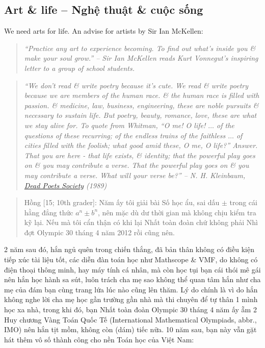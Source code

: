 \documentclass[12pt]{article}
\begin{document}
\subsection{Art \& life -- Nghệ thuật \& cuộc sống}
We need arts for life. An advise for artists by Sir {\sc Ian McKellen}:
\begin{quotation}\it
	``Practice any art to experience becoming. To find out what's inside you \& make your soul grow.'' -- Sir {\sc Ian McKellen} reads Kurt Vonnegut's inspiring letter to a group of school students.
\end{quotation}

\begin{quotation}\it
	``We don't read \& write poetry because it's cute. We read \& write poetry because we are members of the human race. \& the human race is filled with passion. \& medicine, law, business, engineering, these are noble pursuits \& necessary to sustain life. But poetry, beauty, romance, love, these are what we stay alive for. To quote from Whitman, ``O me! O life! $\ldots$ of the questions of these recurring; of the endless trains of the faithless $\ldots$ of cities filled with the foolish; what good amid these, O me, O life?'' Answer. That you are here - that life exists, \& identity; that the powerful play goes on \& you may contribute a verse. That the powerful play \emph{goes on} \& you may contribute a verse. What will your verse be?'' --  {\sc N. H. Kleinbaum}, \href{https://www.imdb.com/title/tt0097165}{\it Dead Poets Society} (1989)
\end{quotation}

\begin{quote}
	{\sf Hồng [15; 10th grader]}: Năm ấy tôi giải bài Số học ẩu, sai dấu $\pm$ trong cái hằng đẳng thức $a^n\pm b^n$, nên mặc dù dư thời gian mà không chịu kiểm tra kỹ lại. Nếu mà tôi cẩn thận có khi lại Nhất toàn đoàn chứ không phải Nhì đợt Olympic 30 tháng 4 năm 2012 rồi cũng nên.
\end{quote}
2 năm sau đó, hắn ngủ quên trong chiến thắng, đã bản thân không có điều kiện tiếp xúc tài liệu tốt, các diễn đàn toán học như Mathscope \& VMF, do không có điện thoại thông minh, hay máy tính cá nhân, mà còn học tụi bạn cái thói mê gái nên hắn học hành sa sút, luôn trách cha mẹ sao không thể quan tâm hắn như cha mẹ của đám bạn cùng trang lứa lúc nào cũng lên thăm. Lý do chính là vì do hắn không nghe lời cha mẹ học gần trường gần nhà mà thi chuyên để tự thân 1 mình học xa nhà, trong khi đó, bạn Nhất toàn đoàn Olympic 30 tháng 4 năm ấy ẵm 2 Huy chương Vàng Toán Quốc Tế (International Mathematical Olympiads, abbr., IMO) nên hắn tịt mồm, không còn (dám) tiếc nữa. 10 năm sau, bạn này vẫn gặt hát thêm vô số thành công cho nền Toán học của Việt Nam:
\end{document}
